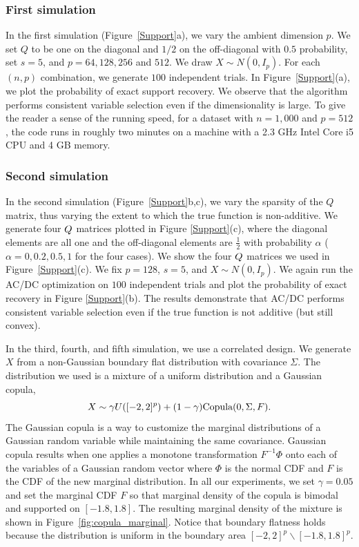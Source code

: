 \subsubsection{First simulation}
In the \textrm{first simulation} (Figure~\ref{Support}a), we vary the
ambient dimension $p$. We set $Q$ to be one on the diagonal and $1/2$ on
the off-diagonal with $0.5$ probability, set $s=5$, and $p=64,128,256$
and $512$. We draw $X \sim N(0, I_p)$.  For each $(n,p)$ combination,
we generate $100$ independent trials.  In Figure~\ref{Support}(a), we
plot the probability of exact support recovery. We observe that the
algorithm performs consistent variable selection even if the
dimensionality is large. To give the reader a sense of the running
speed, for a dataset with $n=1,000$ and $p=512$, the code runs in
roughly two minutes on a machine with a 2.3 GHz Intel Core i5 CPU and 4
GB memory.


\subsubsection{Second simulation}
In the \textrm{second simulation} (Figure~\ref{Support}b,c), we vary
the sparsity of the $Q$ matrix, thus varying the extent to which
the true function is non-additive. We generate four $Q$ matrices
plotted in Figure \ref{Support}(c), where the diagonal elements are
all one and the off-diagonal elements are $\frac{1}{2}$ with
probability $\alpha$ ($\alpha=0,0.2,0.5,1$ for the four cases). We
show the four $Q$ matrices we used in Figure~\ref{Support}(c).  We fix
$p=128$, $s=5$, and $X \sim N(0,I_p)$.  We again run the AC/DC
optimization on $100$ independent trials and plot the probability of
exact recovery in Figure \ref{Support}(b). The results demonstrate
that AC/DC performs consistent variable selection even if the true
function is not additive (but still convex).

In the third, fourth, and fifth simulation, we use a correlated design. We generate $X$ from a non-Gaussian boundary flat distribution with covariance $\Sigma$. The distribution we used is a mixture of a uniform distribution and a Gaussian copula,
\[
X \sim \gamma U([-2, 2]^p) + (1-\gamma) \textrm{Copula}(0, \Sigma, F).
\]
The Gaussian copula is a way to customize the marginal distributions of a Gaussian random variable while maintaining the same covariance. Gaussian copula results when one applies a monotone transformation $F^{-1} \Phi$ onto each of the variables of a Gaussian random vector where $\Phi$ is the normal CDF and $F$ is the CDF of the new marginal distribution. In all our experiments, we set $\gamma = 0.05$ and set the marginal CDF $F$ so that marginal density of the copula is bimodal and supported on $[-1.8, 1.8]$. The resulting marginal density of the mixture is shown in Figure~\ref{fig:copula_marginal}. Notice that boundary flatness holds because the distribution is uniform in the boundary area $[-2,2]^p \backslash [-1.8, 1.8]^p$.

